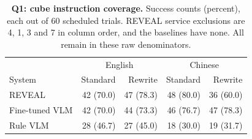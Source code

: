 \begin{table}[t]
\centering\small
\setlength{\tabcolsep}{2pt}
\begin{tabular}{@{}lrrrr@{}}
\toprule
 & \multicolumn{2}{c}{English} & \multicolumn{2}{c}{Chinese}\\
System & Standard & Rewrite & Standard & Rewrite\\
\midrule
REVEAL & 42 (70.0) & 47 (78.3) & 48 (80.0) & 36 (60.0)\\
Fine-tuned VLM & 42 (70.0) & 44 (73.3) & 46 (76.7) & 47 (78.3)\\
Rule VLM & 28 (46.7) & 27 (45.0) & 18 (30.0) & 19 (31.7)\\
\bottomrule
\end{tabular}
\caption{\textbf{Q1: cube instruction coverage.} Success counts (percent), each out of 60 scheduled trials. REVEAL service exclusions are 4, 1, 3 and 7 in column order, and the baselines have none. All remain in these raw denominators.}
\label{tab:cube-language}
\end{table}
